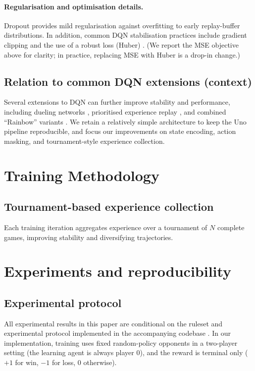 \documentclass[11pt]{article}
\begin{document}
\paragraph{Regularisation and optimisation details.}
Dropout provides mild regularisation against overfitting to early replay-buffer distributions. In addition, common DQN stabilisation practices include gradient clipping and the use of a robust loss (Huber) \parencite{mnih2015human}. (We report the MSE objective above for clarity; in practice, replacing MSE with Huber is a drop-in change.)

\subsection{Relation to common DQN extensions (context)}
Several extensions to DQN can further improve stability and performance, including dueling networks \parencite{wang2016dueling}, prioritised experience replay \parencite{schaul2016prioritized}, and combined ``Rainbow'' variants \parencite{hessel2018rainbow}. We retain a relatively simple architecture to keep the Uno pipeline reproducible, and focus our improvements on state encoding, action masking, and tournament-style experience collection.

\section{Training Methodology}
\subsection{Tournament-based experience collection}
Each training iteration aggregates experience over a tournament of $N$ complete games, improving stability and diversifying trajectories.

\section{Experiments and reproducibility}
\subsection{Experimental protocol}
All experimental results in this paper are conditional on the ruleset and experimental protocol implemented in the accompanying codebase \parencite{policyuno_repo}. In our implementation, training uses fixed random-policy opponents in a two-player setting (the learning agent is always player 0), and the reward is terminal only ($+1$ for win, $-1$ for loss, $0$ otherwise).
\end{document}
